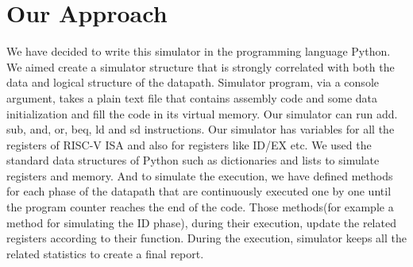 \section{Our Approach}
We have decided to write this simulator in the programming language Python. We aimed create a simulator structure that is strongly correlated with both the data and logical structure of the datapath. Simulator program, via a console argument, takes a plain text file that contains assembly code and some data initialization and fill the code in its virtual memory. Our simulator can run add. sub, and, or, beq, ld and sd instructions. Our simulator has variables for all the registers of RISC-V ISA and also for registers like ID/EX etc. We used the standard data structures of Python such as dictionaries and lists to simulate registers and memory. And to simulate the execution, we have defined methods for each phase of the datapath that are continuously executed one by one until the program counter reaches the end of the code. Those methods(for example a method for simulating the ID phase), during their execution, update the related registers according to their function. During the execution, simulator keeps all the related statistics to create a final report.


